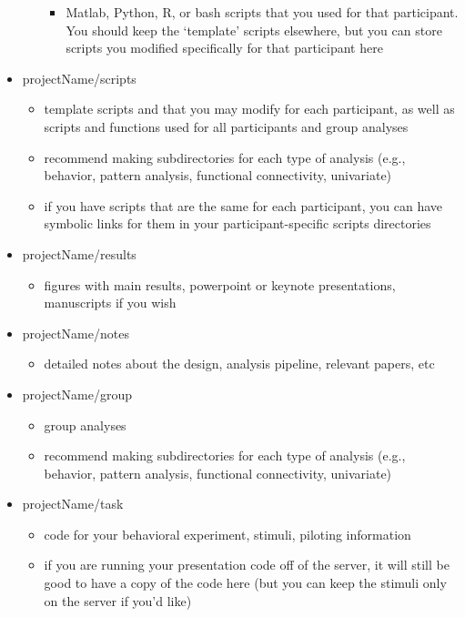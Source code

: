 \documentclass[]{book}
\providecommand{\tightlist}{%
  \setlength{\itemsep}{0pt}\setlength{\parskip}{0pt}}
\begin{document}
\begin{itemize}
\begin{itemize}
    \begin{itemize}
    \tightlist
    \item
      Matlab, Python, R, or bash scripts that you used for that participant. You should keep the `template' scripts elsewhere, but you can store scripts you modified specifically for that participant here
    \end{itemize}
  \end{itemize}
\item
  projectName/scripts

  \begin{itemize}
  \tightlist
  \item
    template scripts and that you may modify for each participant, as well as scripts and functions used for all participants and group analyses
  \item
    recommend making subdirectories for each type of analysis (e.g., behavior, pattern analysis, functional connectivity, univariate)
  \item
    if you have scripts that are the same for each participant, you can have symbolic links for them in your participant-specific scripts directories
  \end{itemize}
\item
  projectName/results

  \begin{itemize}
  \tightlist
  \item
    figures with main results, powerpoint or keynote presentations, manuscripts if you wish
  \end{itemize}
\item
  projectName/notes

  \begin{itemize}
  \tightlist
  \item
    detailed notes about the design, analysis pipeline, relevant papers, etc
  \end{itemize}
\item
  projectName/group

  \begin{itemize}
  \tightlist
  \item
    group analyses
  \item
    recommend making subdirectories for each type of analysis (e.g., behavior, pattern analysis, functional connectivity, univariate)
  \end{itemize}
\item
  projectName/task

  \begin{itemize}
  \tightlist
  \item
    code for your behavioral experiment, stimuli, piloting information
  \item
    if you are running your presentation code off of the server, it will still be good to have a copy of the code here (but you can keep the stimuli only on the server if you'd like)
  \end{itemize}
\end{itemize}
\end{document}
